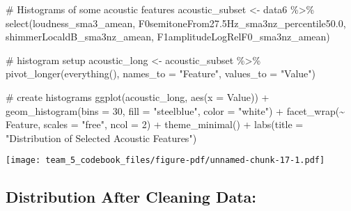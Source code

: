 \documentclass[
  letterpaper,
  DIV=11,
  numbers=noendperiod]{scrartcl}
\newenvironment{Shaded}{\begin{snugshade}}{\end{snugshade}}
\newcommand{\AttributeTok}[1]{\textcolor[rgb]{0.40,0.45,0.13}{#1}}
\newcommand{\CommentTok}[1]{\textcolor[rgb]{0.37,0.37,0.37}{#1}}
\newcommand{\DecValTok}[1]{\textcolor[rgb]{0.68,0.00,0.00}{#1}}
\newcommand{\FloatTok}[1]{\textcolor[rgb]{0.68,0.00,0.00}{#1}}
\newcommand{\FunctionTok}[1]{\textcolor[rgb]{0.28,0.35,0.67}{#1}}
\newcommand{\NormalTok}[1]{\textcolor[rgb]{0.00,0.23,0.31}{#1}}
\newcommand{\OtherTok}[1]{\textcolor[rgb]{0.00,0.23,0.31}{#1}}
\newcommand{\SpecialCharTok}[1]{\textcolor[rgb]{0.37,0.37,0.37}{#1}}
\newcommand{\StringTok}[1]{\textcolor[rgb]{0.13,0.47,0.30}{#1}}
\begin{document}
\begin{Shaded}
\begin{Highlighting}[]
\CommentTok{\# Histograms of some acoustic features}
\NormalTok{acoustic\_subset }\OtherTok{\textless{}{-}}\NormalTok{ data6 }\SpecialCharTok{\%\textgreater{}\%}
  \FunctionTok{select}\NormalTok{(loudness\_sma3\_amean,}
\NormalTok{         F0semitoneFrom27}\FloatTok{.5}\NormalTok{Hz\_sma3nz\_percentile50}\FloatTok{.0}\NormalTok{,}
\NormalTok{         shimmerLocaldB\_sma3nz\_amean,}
\NormalTok{         F1amplitudeLogRelF0\_sma3nz\_amean)}

\CommentTok{\# histogram setup}
\NormalTok{acoustic\_long }\OtherTok{\textless{}{-}}\NormalTok{ acoustic\_subset }\SpecialCharTok{\%\textgreater{}\%}
  \FunctionTok{pivot\_longer}\NormalTok{(}\FunctionTok{everything}\NormalTok{(), }\AttributeTok{names\_to =} \StringTok{"Feature"}\NormalTok{, }\AttributeTok{values\_to =} \StringTok{"Value"}\NormalTok{)}

\CommentTok{\# create histograms}
\FunctionTok{ggplot}\NormalTok{(acoustic\_long, }\FunctionTok{aes}\NormalTok{(}\AttributeTok{x =}\NormalTok{ Value)) }\SpecialCharTok{+}
  \FunctionTok{geom\_histogram}\NormalTok{(}\AttributeTok{bins =} \DecValTok{30}\NormalTok{, }\AttributeTok{fill =} \StringTok{"steelblue"}\NormalTok{, }\AttributeTok{color =} \StringTok{"white"}\NormalTok{) }\SpecialCharTok{+}
  \FunctionTok{facet\_wrap}\NormalTok{(}\SpecialCharTok{\textasciitilde{}}\NormalTok{ Feature, }\AttributeTok{scales =} \StringTok{"free"}\NormalTok{, }\AttributeTok{ncol =} \DecValTok{2}\NormalTok{) }\SpecialCharTok{+}
  \FunctionTok{theme\_minimal}\NormalTok{() }\SpecialCharTok{+}
  \FunctionTok{labs}\NormalTok{(}\AttributeTok{title =} \StringTok{"Distribution of Selected Acoustic Features"}\NormalTok{)}
\end{Highlighting}
\end{Shaded}

\begin{center}
\texttt{[image: team\_5\_codebook\_files/figure-pdf/unnamed-chunk-17-1.pdf]}
\end{center}

\subsection{Distribution After Cleaning
Data:}\label{distribution-after-cleaning-data}
\end{document}

